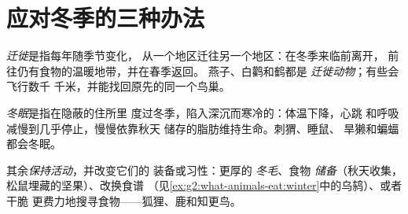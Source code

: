 \section{应对冬季的三种办法}

\begin{definition}[迁徙]\label{def:g3:animals-through-seasons:migration}
\emph{迁徙}是指每年随季节变化，
从一个地区迁往另一个地区：在冬季来临前离开，
前往仍有食物的温暖地带，并在春季返回。
燕子、白鹳和鹤都是
\emph{迁徙动物}；有些会飞行数千
千米，并能找回原先的同一个鸟巢。
\end{definition}

\begin{definition}[冬眠]\label{def:g3:animals-through-seasons:hibernation}
\emph{冬眠}是指在隐蔽的住所里
度过冬季，陷入深沉而寒冷的：体温下降，心跳
和呼吸减慢到几乎停止，慢慢依靠秋天
储存的脂肪维持生命。刺猬、睡鼠、
旱獭和蝙蝠都会冬眠。
\end{definition}

\begin{definition}[保持活动]\label{def:g3:animals-through-seasons:active}
其余\emph{保持活动}，并改变它们的
装备或习性：更厚的
\emph{冬毛}、食物
\emph{储备}（秋天收集，
松鼠埋藏的坚果）、改换食谱
（见\cref{ex:g2:what-animals-eat:winter}中的乌鸫）、或者干脆
更费力地搜寻食物——狐狸、鹿和知更鸟。
\end{definition}

